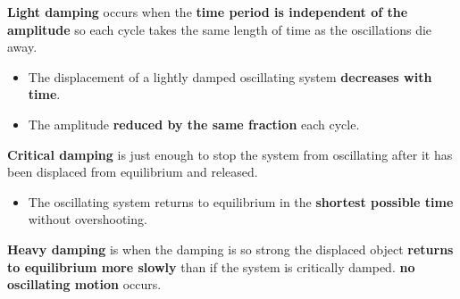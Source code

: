 \textbf{Light damping} occurs when the \textbf{time period is independent of the amplitude} so each cycle takes the same length of time as the oscillations die away.
\begin{itemize}
    \item The displacement of a lightly damped oscillating system \textbf{decreases with time}.
    \item The amplitude \textbf{reduced by the same fraction} each cycle.
\end{itemize}

\textbf{Critical damping} is just enough to stop the system from oscillating after it has been displaced from equilibrium and released.
\begin{itemize}
    \item The oscillating system returns to equilibrium in the \textbf{shortest possible time} without overshooting.
\end{itemize}

\textbf{Heavy damping} is when the damping is so strong the displaced object \textbf{returns to equilibrium more slowly} than if the system is critically damped. \textbf{no oscillating motion} occurs.
